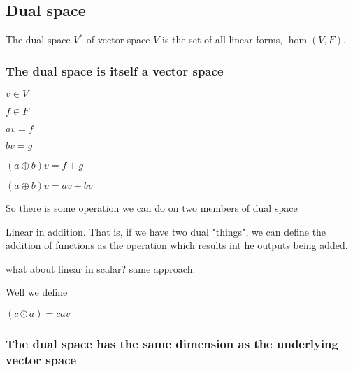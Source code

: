 
\subsection{Dual space}

The dual space \(V^*\) of vector space \(V\) is the set of all linear forms, \(\hom(V,F)\).

\subsubsection{The dual space is itself a vector space}


\(v\in V\)

\(f\in F\)

\(av = f\)

\(bv = g\)

\((a\oplus b)v=f+g\)

\((a\oplus b)v=av + bv\)

So there is some operation we can do on two members of dual space

Linear in addition. That is, if we have two dual "things", we can define the addition of functions as the operation which results int he outputs being added.

what about linear in scalar? same approach.

Well we define 

\((c\odot a)=cav\)

\subsubsection{The dual space has the same dimension as the underlying vector space}

